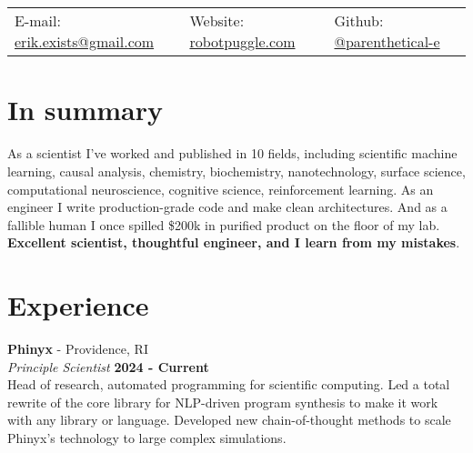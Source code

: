 \documentclass[margin,line]{res}
\begin{document}
\newcommand{\link}[1]{\texttt{#1}}
\providecommand{\tightlist}{%
    \setlength{\itemsep}{0pt}\setlength{\parskip}{0pt}}



\begin{resume}
\section{\sc }
\vspace{.05in}

\begin{tabular}{@{}p{2in}p{2in}p{2in}}
{E-mail:}  {\href{mailto:erik.exists@gmail.com}{erik.exists@gmail.com}} & {Website:} \href{http://robotpuggle.com}{robotpuggle.com} & {Github:} \href{https://github.com/parenthetical-e/}{@parenthetical-e} \\
\end{tabular}

\vspace{-.4cm}
\section{\sc In summary}
As a scientist I've worked and published in 10 fields, including scientific machine learning, causal analysis, chemistry,  biochemistry, nanotechnology, surface science, computational neuroscience, cognitive science, reinforcement learning. As an engineer I write production-grade code and make clean architectures. And as a fallible human I once spilled \$200k in purified product on the floor of my lab. \textbf{Excellent scientist, thoughtful engineer, and I learn from my mistakes}.



\vspace{-.35cm}
\section{\sc Experience}
{\bf Phinyx} - Providence, RI\\
{\em Principle Scientist} \hfill {\bf 2024 - Current}\\
Head of research, automated programming for scientific computing. Led a total rewrite of the core library for NLP-driven program synthesis to make it work with any library or language. Developed new chain-of-thought methods to scale Phinyx's technology to large complex simulations. 


\end{resume}
\end{document}

